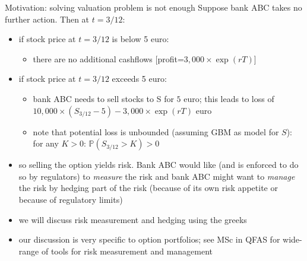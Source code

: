 \documentclass[pdf, handout]{beamer}
\begin{document}
\begin{frame}{Motivation: solving valuation problem is not enough}
Suppose bank ABC takes no further action. Then at $t=3/12$:
\begin{itemize}
\item if stock price at $t=3/12$ is below 5 euro:
\begin{itemize}
\item there are no additional cashflows [profit=$3,000\times\exp(rT)$] 
\end{itemize}
\item if stock price at $t=3/12$ exceeds 5 euro:
\begin{itemize}
\item bank ABC needs to sell stocks to S for $5$ euro; this leads to loss
of $10,000 \times (S_{3/12} -5) - 3,000\times\exp(rT)$ euro
\item note that potential loss is unbounded (assuming GBM as model for $S$):  for any $K>0$:  $\mathbb{P}(S_{3/12} > K)>0$
\end{itemize}
\item so selling the option yields risk. Bank ABC would like (and is enforced to do so by regulators) to \emph{measure}  the risk
and bank ABC might want to \emph{manage} the risk by hedging part of the risk (because of its own risk appetite or because of regulatory limits)
\item we will discuss risk measurement and hedging using the greeks
\item our discussion is very specific to option portfolios; see MSc in QFAS for wide-range of tools for risk measurement and management
\end{itemize}
\end{frame}

%
%
\end{document}
